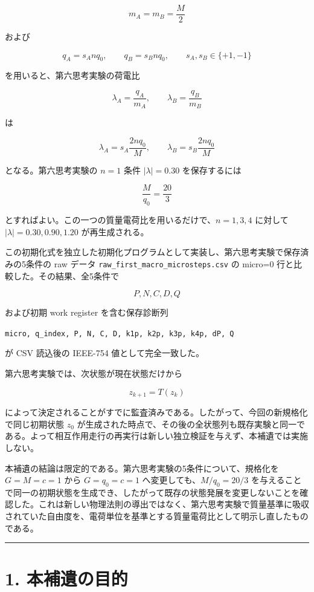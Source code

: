 \documentclass[
  a4paper,
]{ltjsarticle}
\begin{document}
\[
m_A=m_B=\frac{M}{2}
\]

および

\[
q_A=s_A n q_0,\qquad q_B=s_B n q_0,
\qquad s_A,s_B\in\{+1,-1\}
\]

を用いると、第六思考実験の荷電比

\[
\lambda_A=\frac{q_A}{m_A},\qquad
\lambda_B=\frac{q_B}{m_B}
\]

は

\[
\lambda_A=s_A\frac{2nq_0}{M},\qquad
\lambda_B=s_B\frac{2nq_0}{M}
\]

となる。第六思考実験の \(n=1\) 条件 \(|\lambda|=0.30\) を保存するには

\[
\boxed{\frac{M}{q_0}=\frac{20}{3}}
\]

とすればよい。この一つの質量電荷比を用いるだけで、\(n=1,3,4\) に対して
\(|\lambda|=0.30,0.90,1.20\) が再生成される。

この初期化式を独立した初期化プログラムとして実装し、第六思考実験で保存済みの5条件の
raw データ \texttt{raw\_first\_macro\_microsteps.csv} の micro=0
行と比較した。その結果、全5条件で

\[
P,N,C,D,Q
\]

および初期 work register を含む保存診断列

\texttt{micro,\ q\_index,\ P,\ N,\ C,\ D,\ k1p,\ k2p,\ k3p,\ k4p,\ dP,\ Q}

が CSV 読込後の IEEE-754 値として完全一致した。

第六思考実験では、次状態が現在状態だけから

\[
z_{k+1}=T(z_k)
\]

によって決定されることがすでに監査済みである。したがって、今回の新規格化で同じ初期状態
\(z_0\)
が生成された時点で、その後の全状態列も既存実験と同一である。よって相互作用走行の再実行は新しい独立検証を与えず、本補遺では実施しない。

本補遺の結論は限定的である。第六思考実験の5条件について、規格化を
\(G=M=c=1\) から \(G=q_0=c=1\) へ変更しても、\(M/q_0=20/3\)
を与えることで同一の初期状態を生成でき、したがって既存の状態発展を変更しないことを確認した。これは新しい物理法則の導出ではなく、第六思考実験で質量基準に吸収されていた自由度を、電荷単位を基準とする質量電荷比として明示し直したものである。

\begin{center}\rule{0.5\linewidth}{0.5pt}\end{center}

\section{1. 本補遺の目的}\label{ux672cux88dcux907aux306eux76eeux7684}
\end{document}
